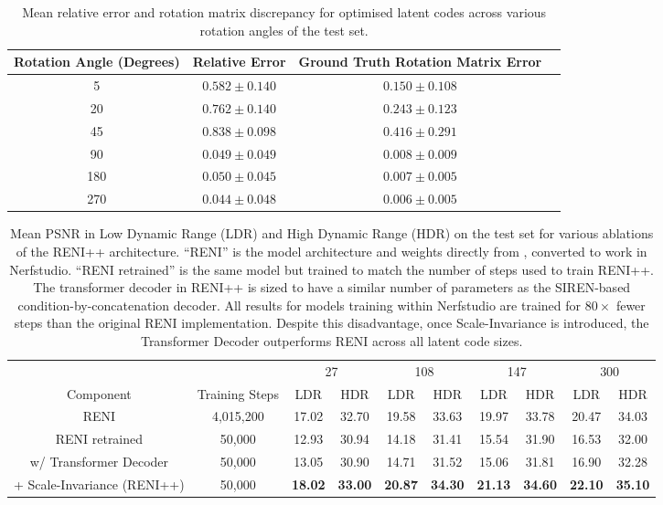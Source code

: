 \begin{table}[h]
\centering
{}
\begin{tabular}{@{}cccc@{}}\toprule
\textbf{Rotation Angle (Degrees)} & \textbf{Relative Error} & \textbf{Ground Truth Rotation Matrix Error} \\ \midrule
5 & $0.582 \pm 0.140$ & $0.150 \pm 0.108$ \\
20 & $0.762 \pm 0.140$ & $0.243 \pm 0.123$ \\
45 & $0.838 \pm 0.098$ & $0.416 \pm 0.291$ \\
90 & $0.049 \pm 0.049$ & $0.008 \pm 0.009$ \\
180 & $0.050 \pm 0.045$ & $0.007 \pm 0.005$ \\
270 & $0.044 \pm 0.048$ & $0.006 \pm 0.005$ \\
\bottomrule
\end{tabular}
\caption{Mean relative error and rotation matrix discrepancy for optimised latent codes across various rotation angles of the test set.}
\label{tab:rotation_error_comparison}
\end{table}

\begin{table}\centering
{}
\begin{tabular}{@{}c c cc cc cc cc@{}}\toprule
& & \multicolumn{2}{c}{27} & \multicolumn{2}{c}{108} & \multicolumn{2}{c}{147} & \multicolumn{2}{c}{300}   \\
\cmidrule(lr){3-4} \cmidrule(lr){5-6} \cmidrule(lr){7-8} \cmidrule(lr){9-10}
Component & Training Steps & LDR & HDR & LDR & HDR & LDR & HDR & LDR & HDR \\
\midrule
RENI \cite{gardner2022rotation} & 4,015,200 & 17.02 & 32.70 & 19.58 & 33.63 & 19.97 & 33.78 & 20.47 & 34.03 \\
RENI retrained & 50,000 & 12.93 & 30.94 & 14.18 & 31.41 & 15.54 & 31.90 & 16.53 & 32.00 \\
w/ Transformer Decoder & 50,000 & 13.05 & 30.90 & 14.71 & 31.52 & 15.06 & 31.81 & 16.90 & 32.28 \\
+ Scale-Invariance (RENI++) & 50,000 & \textbf{18.02} & \textbf{33.00} & \textbf{20.87} & \textbf{34.30} & \textbf{21.13} & \textbf{34.60} & \textbf{22.10} & \textbf{35.10} \\
\bottomrule
\end{tabular}
\caption{Mean PSNR in Low Dynamic Range (LDR) and High Dynamic Range (HDR) on the test set for various ablations of the RENI++ architecture. ``RENI'' is the model architecture and weights directly from \cite{gardner2022rotation}, converted to work in Nerfstudio. ``RENI retrained'' is the same model but trained to match the number of steps used to train RENI++. The transformer decoder in RENI++ is sized to have a similar number of parameters as the SIREN-based condition-by-concatenation decoder. All results for models training within Nerfstudio are trained for $80\times$ fewer steps than the original RENI implementation. Despite this disadvantage, once Scale-Invariance is introduced, the Transformer Decoder outperforms RENI across all latent code sizes.}
\label{tab:ablation_study}
\end{table}


